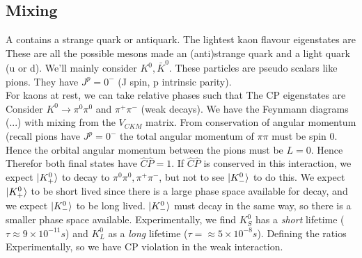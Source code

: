 \documentclass{article}
\begin{document}
\subsection{ Mixing}
A  contains a strange quark or antiquark. The lightest kaon flavour eigenstates are 
These are all the possible mesons made an (anti)strange quark and a light quark (u or d). We'll mainly consider $K^0, \bar{K}^0$. These particles are pseudo scalars like pions. They have $J^p = 0^-$ (J spin, p intrinsic parity). \\
For kaons at rest, we can take relative phases such that 
The CP eigenstates are 
Consider $K^0 \to \pi^0 \pi^0$ and $\pi^+ \pi^-$ (weak decays). We have the Feynmann diagrams (...) with mixing from the $V_{CKM}$ matrix. 
From conservation of angular momentum (recall pions have $J^p = 0^-$ the total angular momentum of $\pi\pi$ must be spin 0. Hence the orbital angular momentum between the pions must be $L=0$. Hence 
Therefor both final states have $\hat{C} \hat{P} = 1$. If $\hat{C} \hat{P}$ is conserved in this interaction, we expect $\ket{K^0_+}$ to decay to $\pi^0 \pi^0, \pi^+ \pi^-$, but not to see $\ket{K^0_-}$ to do this. We expect $\ket{K^0_+}$ to be short lived since there is a large phase space available for decay, and we expect $\ket{K^0_-}$ to be long lived. $\ket{K^0_-}$ must decay in the same way, so there is a smaller phase space available.
Experimentally, we find $K_S^0$ has a \emph{short} lifetime ($\tau \approx 9 \times 10^{-11}s$) and $K_L^0$ as a \emph{long} lifetime ($\tau = \approx 5\times 10^{-8}s$). Defining the ratios 
Experimentally, 
so we have CP violation in the weak interaction.
\end{document}
